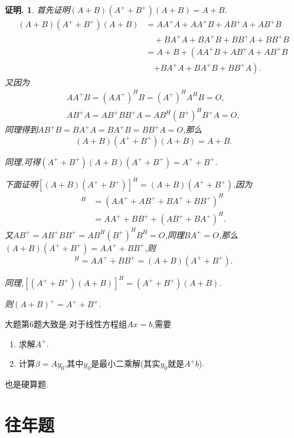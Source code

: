 \documentclass[oneside,a4paper,12pt]{ctexbook}
\theoremstyle{nonumberplain}
\newtheorem{inproof}{证明.}
\theoremstyle{nonumberplain}
\theoremstyle{nonumberplain}
\newenvironment{proof}{
    \begin{tcolorbox}[enhanced,colback=cyan!5!white,colframe=cyan!75!black,drop fuzzy shadow,breakable,arc=0mm]
        \begin{inproof}
}{
        \end{inproof}
    \end{tcolorbox}
}
\begin{document}
    \begin{proof}
        首先证明$(A+B)(A^++B^+)(A+B)=A+B$.
        \begin{align*}
            (A+B)(A^++B^+)(A+B)&=AA^+A+AA^+B+AB^+A+AB^+B\\
            &\quad+BA^+A+BA^+B+BB^+A+BB^+B\\
            &=A+B+\left(AA^+B+AB^+A+AB^+B\right.\\
            &\quad\left.+BA^+A+BA^+B+BB^+A\right).
        \end{align*}
        又因为
        \begin{gather*}
            AA^+B=(AA^+)^HB=(A^+)^HA^HB=O,\\
            AB^+A=AB^+BB^+A=AB^H(B^+)^HB^+A=O,
        \end{gather*}
        同理得到$AB^+B=BA^+A=BA^+B=BB^+A=O$,那么
        \begin{equation*}
            (A+B)(A^++B^+)(A+B)=A+B.
        \end{equation*}

        同理,可得$(A^++B^+)(A+B)(A^++B^+)=A^++B^+$.

        下面证明$[(A+B)(A^++B^+)]^H=(A+B)(A^++B^+)$.因为
        \begin{align*}
            [(A+B)(A^++B^+)]^H&=(AA^++AB^++BA^++BB^+)^H\\
            &=AA^++BB^++(AB^++BA^+)^H.
        \end{align*}
        又$AB^+=AB^+BB^+=AB^H(B^+)^HB^H=O$,同理$BA^+=O$,那么$(A+B)(A^++B^+)=AA^++BB^+$,则
        \begin{equation*}
            [(A+B)(A^++B^+)]^H=AA^++BB^+=(A+B)(A^++B^+).
        \end{equation*}

        同理,$[(A^++B^+)(A+B)]^H=(A^++B^+)(A+B)$.

        则$(A+B)^+=A^++B^+$.
    \end{proof}

    大题第6题大致是:对于线性方程组$Ax=b$,需要
    \begin{enumerate}
        \item 求解$A^+$.
        \item 计算$\beta=Ay_0$,其中$y_0$是最小二乘解(其实$y_0$就是$A^+b$).
    \end{enumerate}
    也是硬算题.

    \section{往年题}
\end{document}
